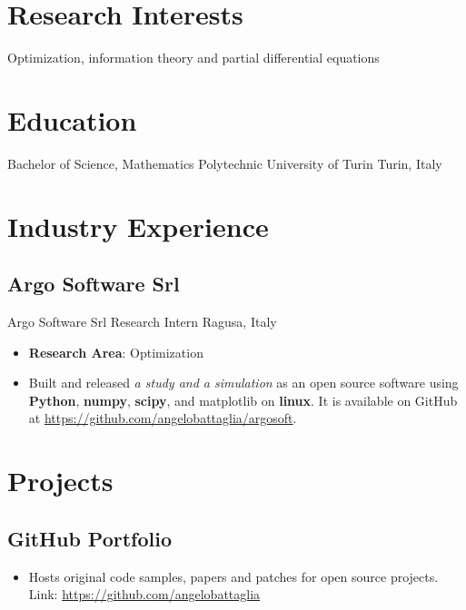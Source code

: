 \documentclass[11pt,letter,roman]{moderncv}
\begin{document}
\makecvtitle

\section{ Research Interests }

Optimization, information theory and partial differential equations

\section{ Education }
    \cventry{}%
      {Bachelor of Science, Mathematics}%
      {Polytechnic University of Turin}%
      {Turin, Italy}%
      {}%
      {}
  
\section{ Industry Experience }
    \subsection{Argo Software Srl}
      {Argo Software Srl}%
      {Research Intern}%
      {Ragusa, Italy}%
      {}%
      {
        \begin{itemize}
        \item {\bf Research Area}: Optimization
        \item Built and released {\it a study and a simulation} as an open source software using {\bf Python}, {\bf numpy}, {\bf scipy}, and {matplotlib\bf} on {\bf linux}. It is available on GitHub at \url{https://github.com/angelobattaglia/argosoft}.\end{itemize}
      }

\section{ Projects }
  
    \subsection{GitHub Portfolio} %
    \begin{itemize}
      \item Hosts original code samples, papers and patches for open source projects. Link: \url{ https://github.com/angelobattaglia } 
    \end{itemize}
    
\end{document}
